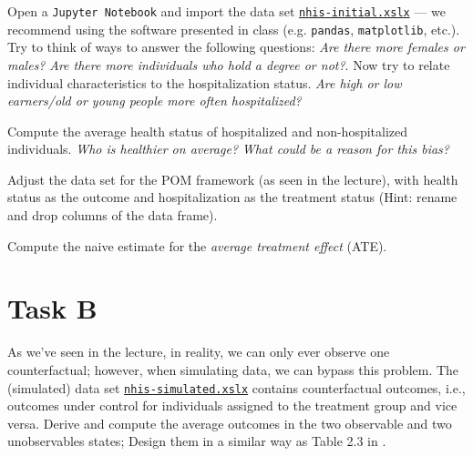 \begin{boenumerate}

  \item Open a \texttt{Jupyter Notebook} and import the data set \href{https://github.com/HumanCapitalAnalysis/microeconometrics/tree/master/problem-sets/01-potential-outcome-model/data}{\texttt{nhis-initial.xslx}} --- we recommend using the software presented in class (e.g. \texttt{pandas}, \texttt{matplotlib}, etc.). Try to think of ways to answer the following questions: \emph{Are there more females or males?} \emph{Are there more individuals who hold a degree or not?}. Now try to relate individual characteristics to the hospitalization status. \emph{Are high or low earners/old or young people more often hospitalized?}

  \item Compute the average health status of hospitalized and non-hospitalized individuals. \emph{Who is healthier on average?} \emph{What could be a reason for this bias?}

  \item Adjust the data set for the POM framework (as seen in the lecture), with health status as the outcome and hospitalization as the treatment status (Hint: rename and drop columns of the data frame).

  \item Compute the naive estimate for the \emph{average treatment effect} (ATE).

\end{boenumerate}


\section*{Task B}

\begin{boenumerate}
  \item As we've seen in the lecture, in reality, we can only ever observe one counterfactual; however, when simulating data, we can bypass this problem. The (simulated) data set  \href{https://github.com/HumanCapitalAnalysis/microeconometrics/tree/master/problem-sets/01-potential-outcome-model/data}{\texttt{nhis-simulated.xslx}} contains counterfactual outcomes, i.e., outcomes under control for individuals assigned to the treatment group and vice versa. Derive and compute the average outcomes in the two observable and two unobservables states; Design them in a similar way as Table 2.3 in \cite{Morgan.2014}.

\end{boenumerate}

